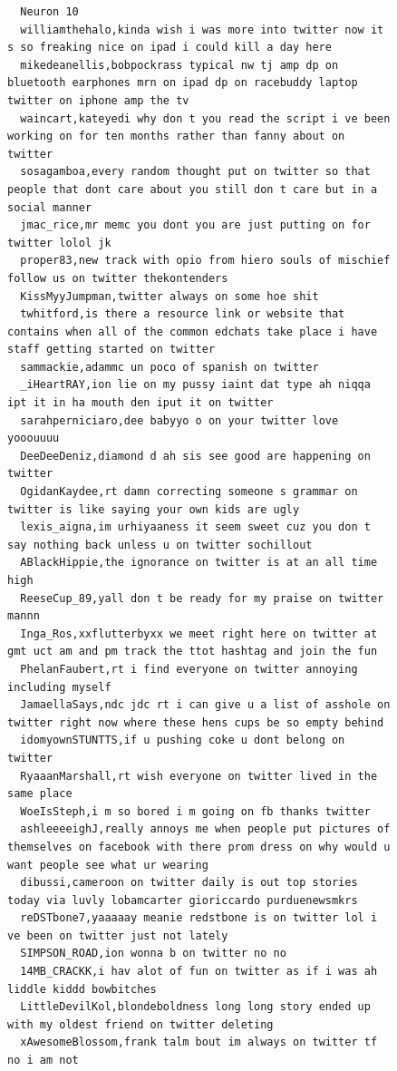 \begin{figure}[htpb]
\begin{verbatim}
  Neuron 10
  williamthehalo,kinda wish i was more into twitter now it s so freaking nice on ipad i could kill a day here
  mikedeanellis,bobpockrass typical nw tj amp dp on bluetooth earphones mrn on ipad dp on racebuddy laptop twitter on iphone amp the tv
  waincart,kateyedi why don t you read the script i ve been working on for ten months rather than fanny about on twitter
  sosagamboa,every random thought put on twitter so that people that dont care about you still don t care but in a social manner
  jmac_rice,mr memc you dont you are just putting on for twitter lolol jk
  proper83,new track with opio from hiero souls of mischief follow us on twitter thekontenders
  KissMyyJumpman,twitter always on some hoe shit
  twhitford,is there a resource link or website that contains when all of the common edchats take place i have staff getting started on twitter
  sammackie,adammc un poco of spanish on twitter
  _iHeartRAY,ion lie on my pussy iaint dat type ah niqqa ipt it in ha mouth den iput it on twitter
  sarahperniciaro,dee babyyo o on your twitter love yooouuuu
  DeeDeeDeniz,diamond d ah sis see good are happening on twitter
  OgidanKaydee,rt damn correcting someone s grammar on twitter is like saying your own kids are ugly
  lexis_aigna,im urhiyaaness it seem sweet cuz you don t say nothing back unless u on twitter sochillout
  ABlackHippie,the ignorance on twitter is at an all time high
  ReeseCup_89,yall don t be ready for my praise on twitter mannn
  Inga_Ros,xxflutterbyxx we meet right here on twitter at gmt uct am and pm track the ttot hashtag and join the fun
  PhelanFaubert,rt i find everyone on twitter annoying including myself
  JamaellaSays,ndc jdc rt i can give u a list of asshole on twitter right now where these hens cups be so empty behind
  idomyownSTUNTTS,if u pushing coke u dont belong on twitter
  RyaaanMarshall,rt wish everyone on twitter lived in the same place
  WoeIsSteph,i m so bored i m going on fb thanks twitter
  ashleeeeighJ,really annoys me when people put pictures of themselves on facebook with there prom dress on why would u want people see what ur wearing
  dibussi,cameroon on twitter daily is out top stories today via luvly lobamcarter gioriccardo purduenewsmkrs
  reDSTbone7,yaaaaay meanie redstbone is on twitter lol i ve been on twitter just not lately
  SIMPSON_ROAD,ion wonna b on twitter no no
  14MB_CRACKK,i hav alot of fun on twitter as if i was ah liddle kiddd bowbitches
  LittleDevilKol,blondeboldness long long story ended up with my oldest friend on twitter deleting
  xAwesomeBlossom,frank talm bout im always on twitter tf no i am not

\end{verbatim}
\end{figure}

